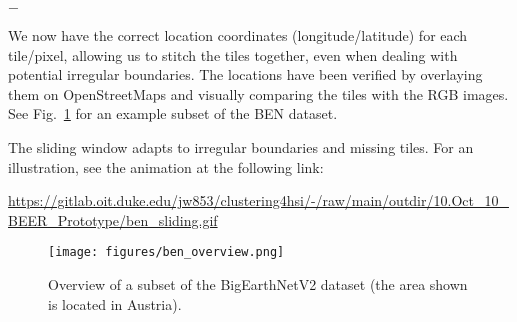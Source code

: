 
\begin{list}{$-$}{}
\item {} We now have the correct 
  location coordinates (longitude/latitude) for each tile/pixel, allowing 
  us to stitch the tiles together, even when dealing with potential irregular 
  boundaries. The locations have been verified by overlaying them on 
  OpenStreetMaps and visually comparing the tiles with the RGB images. 
  See Fig.~\ref{fig:ben_overview} for an example subset of the BEN dataset.

\item {} The sliding window adapts to irregular boundaries and 
  missing tiles. For an illustration, see the animation at the following link:

  \url{https://gitlab.oit.duke.edu/jw853/clustering4hsi/-/raw/main/outdir/10.Oct_10_BEER_Prototype/ben_sliding.gif}
  
\end{list}

\begin{figure}[!htpb]
  \centering
  \texttt{[image: figures/ben\_overview.png]}
  \caption{Overview of a subset of the BigEarthNetV2 dataset (the area
    shown is located in Austria).}
  \label{fig:ben_overview}
\end{figure}
